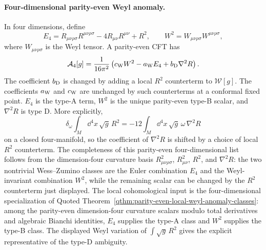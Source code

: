 \paragraph{Four-dimensional parity-even Weyl anomaly.}
In four dimensions, define
\[
  E_4
  =
  R_{\mu\nu\rho\sigma}R^{\mu\nu\rho\sigma}
  -4R_{\mu\nu}R^{\mu\nu}
  +R^2,
  \qquad
  W^2
  =
  W_{\mu\nu\rho\sigma}W^{\mu\nu\rho\sigma},
\]
where \(W_{\mu\nu\rho\sigma}\) is the Weyl tensor.  A parity-even CFT has
\begin{equation}
  \mathcal A_4[g]
  =
  \frac{1}{16\pi^2}
  \left(
    c_{\rm W} W^2
    -a_{\rm W} E_4
    +b_{\rm D}\nabla^2 R
  \right).
  \label{eq:four-dimensional-weyl-anomaly}
\end{equation}
The coefficient \(b_{\rm D}\) is changed by adding a local \(R^2\) counterterm
to \(\mathcal W[g]\).  The coefficients \(a_{\rm W}\) and \(c_{\rm W}\) are
unchanged by such counterterms at a conformal fixed point.
\(E_4\) is the type-A term, \(W^2\) is the unique parity-even type-B scalar,
and \(\nabla^2R\) is type D.  More explicitly,
\[
  \delta_\omega\int_M\dd^4x\,\sqrt g\,R^2
  =
  -12\int_M\dd^4x\,\sqrt g\,\omega\,\nabla^2R
\]
on a closed four-manifold, so the coefficient of \(\nabla^2R\) is shifted by
a choice of local \(R^2\) counterterm.
The completeness of this parity-even four-dimensional list follows from the
dimension-four curvature basis
\(R_{\mu\nu\rho\sigma}^2\), \(R_{\mu\nu}^2\), \(R^2\), and \(\nabla^2R\):
the two nontrivial Wess--Zumino classes are the Euler combination \(E_4\) and
the Weyl-invariant combination \(W^2\), while the remaining scalar can be
changed by the \(R^2\) counterterm just displayed.
The local cohomological input is the four-dimensional specialization of
Quoted Theorem~\ref{qthm:parity-even-local-weyl-anomaly-classes}: among
the parity-even dimension-four curvature scalars modulo total derivatives and
algebraic Bianchi identities, \(E_4\) supplies the type-A class and \(W^2\)
supplies the type-B class.  The displayed Weyl variation of
\(\int\sqrt g\,R^2\) gives the explicit representative of the type-D
ambiguity.

